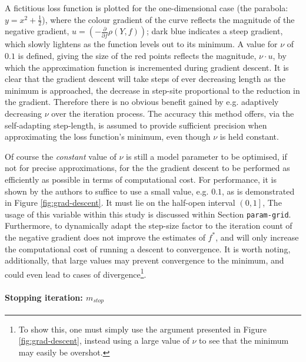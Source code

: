 \documentclass{article}
\begin{document}
A fictitious loss function is plotted for the one-dimensional case (the parabola: $y = x^2 + \frac{1}{2}$), where the colour gradient of the curve reflects the magnitude of the negative gradient, $u = \left( - \frac{\partial}{\partial f}\rho (Y, f)\right)$; dark blue indicates a steep gradient, which slowly lightens as the function levels out to its minimum. A value for $\nu$ of $0.1$ is defined, giving the size of the red points reflects the magnitude, $\nu \cdot u$, by which the approximation function is incremented during gradient descent. It is clear that the gradient descent will take steps of ever decreasing length as the minimum is approached, the decrease in step-site proportional to the reduction in the gradient. Therefore there is no obvious benefit gained by e.g. adaptively decreasing $\nu$ over the iteration process. The accuracy this method offers, via the self-adapting step-length, is assumed to provide sufficient precision when approximating the loss function's minimum, even though $\nu$ is held constant.

Of course the \emph{constant} value of $\nu$ is still a model parameter to be optimised, if not for precise approximations, for the the gradient descent to be performed as efficiently as possible in terms of computational cost. For performance, it is shown by the authors \cite{schmid2008boosting} to suffice to use a small value, e.g. $0.1$, as is demonstrated in Figure \ref{fig:grad-descent}. It must lie on the half-open interval $\left(0 , 1 \right]$, The usage of this variable within this study is discussed within Section \texttt{param-grid}. Furthermore, to dynamically adapt the step-size factor to the iteration count of the negative gradient does not improve the estimates of $f^*$, and will only increase the computational cost of running a descent to convergence. It is worth noting, additionally, that large values may prevent convergence to the minimum, and could even lead to cases of divergence\footnote{To show this, one must simply use the argument presented in Figure \ref{fig:grad-descent}, instead using a large value of $\nu$ to see that the minimum may easily be overshot.}.


\paragraph{Stopping iteration: $m_{stop}$ \label{mstop}}
\label{sec-1-4-2-2}
\end{document}
